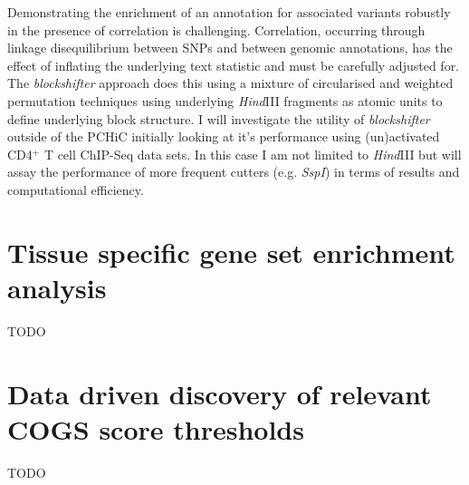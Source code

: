 \documentclass[a4paper,11pt]{report}
\begin{document}
Demonstrating the enrichment of an annotation for associated variants robustly in the presence of correlation is challenging. Correlation, occurring through linkage disequilibrium between SNPs and between genomic annotations,  has the effect of inflating the underlying text statistic and must be carefully adjusted for. The \textit{blockshifter} approach does this using a mixture of circularised and weighted permutation techniques using underlying \textit{Hind}III fragments as atomic units to define underlying block structure. I will investigate the utility of \textit{blockshifter} outside of the PCHiC initially looking at it's performance using (un)activated CD4$^{+}$ T cell ChIP-Seq data sets. In this case I am not limited to \textit{Hind}III but will assay the performance of more frequent cutters (e.g. \textit{SspI}) in terms of results and computational efficiency.

\section{Tissue specific gene set enrichment analysis}
TODO

\section{Data driven discovery of relevant COGS score thresholds}
TODO
\end{document}
